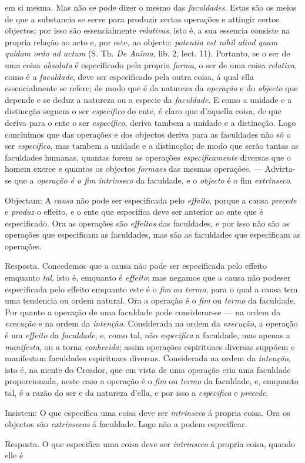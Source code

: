 em si mesma. Mas não se pode dizer o mesmo das \emph{faculdades}. Estas são os meios de que a substancia se serve para produzir certas operações e attingir certos objectos; por isso são essencialmente \emph{relativas}, isto é, a sua essencia consiste na propria relação ao acto e, por este, ao objecto: \emph{potentia est nihil aliud quam quidam ordo ad actum} (S. Th. \emph{De Anima}, lib. 2, lect. 11). Portanto, se o ser de uma coisa \emph{absoluta} é especificado pela propria \emph{forma}, o ser de uma coisa \emph{relativa}, como é a \emph{faculdade}, deve ser especificado pela outra coisa, á qual ella essencialmente se refere; de modo que é da natureza da \emph{operação} e do \emph{objecto} que depende e se deduz a natureza ou a especie da \emph{faculdade}. E como a unidade e a distincção seguem o ser \emph{especifico} do ente, é claro que d'aquella coisa, de que deriva para o ente o ser \emph{especifico}, deriva tambem a unidade e a distincção. Logo concluimos que das operações e dos objectos deriva para as faculdades não só o ser \emph{especifico}, mas tambem a unidade e a distincção; de modo que serão tantas as faculdades humanas, quantas forem as operações \emph{especificamente} diversas que o homem exerce e quantos os objectos \emph{formaes} das mesmas operações. --- Advirta-se que a \emph{operação é o fim intrinseco} da faculdade, e o \emph{objecto} é o fim \emph{extrinseco}.\par Objectam: A \emph{causa} não pode ser especificada pelo \emph{effeito}, porque a causa \emph{precede} e \emph{produz} o effeito, e o ente que especifica deve ser anterior ao ente que é especificado. Ora as operações são \emph{effeitos} das faculdades, e por isso não são as operações que especificam as faculdades, mas são as faculdades que especificam as operações.\par Resposta. Concedemos que a causa não pode ser especificada pelo effeito emquanto \emph{tal}, isto é, emquanto é \emph{effeito}; mas negamos que a causa não podeser especificada pelo effeito emquanto este é o \emph{fim} ou \emph{termo}, para o qual a causa tem uma tendencia ou ordem natural. Ora a operação é o \emph{fim} ou \emph{termo} da faculdade. Por quanto a operação de uma faculdade pode considerar-se --- na ordem da \emph{execução} e na ordem da \emph{intenção}. Considerada na ordem da \emph{execução}, a operação é um \emph{effeito} da \emph{faculdade}, e, como tal, não \emph{especifica} a faculdade, mas apenas a \emph{manifesta}, ou a torna \emph{conhecida}; assim operações espirituaes diversas suppõem e manifestam faculdades espirituaes diversas. Considerada na ordem da \emph{intenção}, isto é, na mente do Creador, que em vista de uma operação cria uma faculdade proporcionada, neste caso a operação é o \emph{fim} ou \emph{termo} da faculdade, e, emquanto tal, é a razão do ser e da natureza d'ella, e por isso a \emph{especifica} e \emph{precede}.\par Insistem: O que especifica uma coisa deve ser \emph{intrinseco} á propria coisa. Ora os objectos são \emph{extrinsecos} á faculdade. Logo não a podem especificar.\par Resposta. O que especifica uma coisa deve ser \emph{intrinseco} á propria coisa, quando elle é 